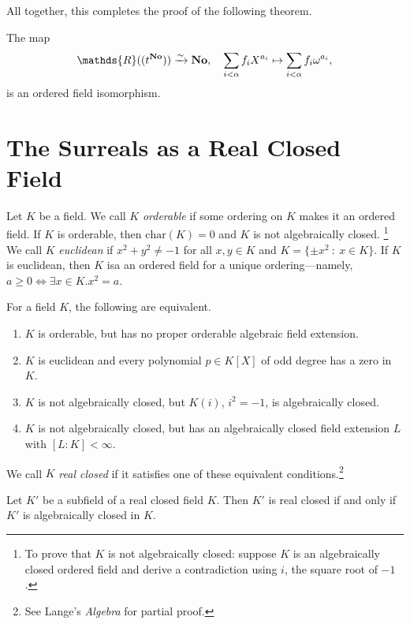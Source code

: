 All together, this completes the proof of the following theorem.

\begin{theorem} The map
$$\mathds{R}((t^{\bf No})) \xrightarrow{\sim} {\bf No}, \quad \sum_{i<\alpha}f_iX^{a_i} \mapsto \sum_{i<\alpha} f_i\omega^{a_i},$$
is an ordered field isomorphism. \end{theorem}



\section{The Surreals as a Real Closed Field}

Let $K$ be a field. We call $K$ \textit{orderable} if some ordering on $K$ makes it an ordered field.  If $K$ is orderable, then $\text{char}(K)=0$ and $K$ is not algebraically closed. \footnote{To prove that $K$ is not algebraically closed: suppose $K$ is an algebraically closed ordered field and derive a contradiction using $i$, the square root of $-1$.}  We call $K$ \textit{euclidean} if $x^2+y^2\neq -1$ for all $x, y \in K$ and $K=\{\pm x^2 \ : \ x\in K\}$.  If $K$ is euclidean, then $K$ isa an ordered field for a unique ordering---namely, $a\geq 0 \iff \exists x\in K. x^2=a$.  

\begin{theorem} \label {7.1} For a field $K$, the following are equivalent. 
\begin{enumerate}[(1)]
\item $K$ is orderable, but has no proper orderable algebraic field extension. 
\item $K$ is euclidean and every polynomial $p\in K[X]$ of odd degree has a zero in $K$. 
\item $K$ is not algebraically closed, but $K(i)$, $i^2=-1$, is algebraically closed. 
\item $K$ is not algebraically closed, but has an algebraically closed field extension $L$ with $[L:K]<\infty$. 
\end{enumerate} 
We call $K$ \textit{real closed} if it satisfies one of these equivalent conditions.\footnote{See Lange's \textit{Algebra} for partial proof.}
\end{theorem}

\begin{corollary}\label{7.2} Let $K'$ be a subfield of a real closed field $K$.  Then $K'$ is real closed if and only if $K'$ is algebraically closed in $K$. \end{corollary}

